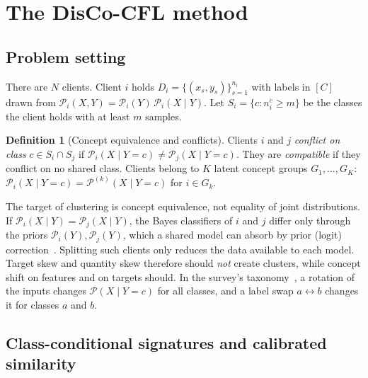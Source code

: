 \documentclass[11pt]{article}
\theoremstyle{definition}
\newtheorem{definition}{Definition}
\theoremstyle{remark}
\newcommand{\cP}{\mathcal{P}}
\begin{document}


\section{The DisCo-CFL method}\label{sec:method}
\subsection{Problem setting}\label{sec:setting}
There are $N$ clients. Client $i$ holds $D_i=\{(x_{s},y_{s})\}_{s=1}^{n_i}$ with labels in $[C]$ drawn from $\cP_i(X,Y)=\cP_i(Y)\,\cP_i(X\mid Y)$. Let $S_i=\{c: n_i^c\ge m\}$ be the classes the client holds with at least $m$ samples.
\begin{definition}[Concept equivalence and conflicts]\label{def:concept}
Clients $i$ and $j$ \emph{conflict on class} $c\in S_i\cap S_j$ if $\cP_i(X\mid Y=c)\neq\cP_j(X\mid Y=c)$. They are \emph{compatible} if they conflict on no shared class. Clients belong to $K$ latent concept groups $G_1,\dots,G_K$: $\cP_i(X\mid Y=c)=\cP^{(k)}(X\mid Y=c)$ for $i\in G_k$.
\end{definition}
The target of clustering is concept equivalence, not equality of joint distributions. If $\cP_i(X\mid Y)=\cP_j(X\mid Y)$, the Bayes classifiers of $i$ and $j$ differ only through the priors $\cP_i(Y),\cP_j(Y)$, which a shared model can absorb by prior (logit) correction~\citep{lipton2018labelshift,menon2021logit}. Splitting such clients only reduces the data available to each model. Target skew and quantity skew therefore should \emph{not} create clusters, while concept shift on features and on targets should. In the survey's taxonomy~\citep{benali2026survey}, a rotation of the inputs changes $\cP(X\mid Y=c)$ for all classes, and a label swap $a\leftrightarrow b$ changes it for classes $a$ and $b$.

\subsection{Class-conditional signatures and calibrated similarity}
\end{document}
